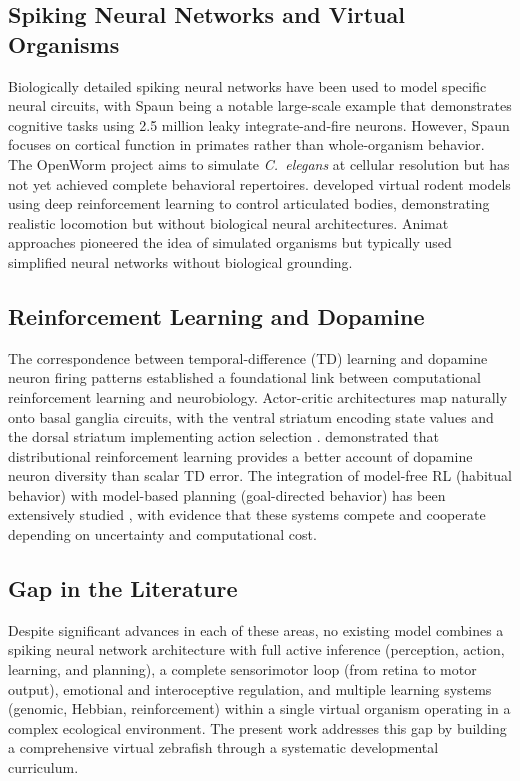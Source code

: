 \documentclass[12pt]{article}
\begin{document}
\subsection{Spiking Neural Networks and Virtual Organisms}

Biologically detailed spiking neural networks have been used to model
specific neural circuits, with Spaun \citep{eliasmith2012} being a
notable large-scale example that demonstrates cognitive tasks using
2.5 million leaky integrate-and-fire neurons.
However, Spaun focuses on cortical function in primates rather than
whole-organism behavior.
The OpenWorm project \citep{openworm2014} aims to simulate
\textit{C.\ elegans} at cellular resolution but has not yet achieved
complete behavioral repertoires.
\citet{merel2019} developed virtual rodent models using deep
reinforcement learning to control articulated bodies, demonstrating
realistic locomotion but without biological neural architectures.
Animat approaches \citep{wilson1991} pioneered the idea of simulated
organisms but typically used simplified neural networks without
biological grounding.

\subsection{Reinforcement Learning and Dopamine}

The correspondence between temporal-difference (TD) learning
\citep{sutton2018} and dopamine neuron firing patterns
\citep{schultz1997} established a foundational link between
computational reinforcement learning and neurobiology.
Actor-critic architectures map naturally onto basal ganglia circuits,
with the ventral striatum encoding state values and the dorsal
striatum implementing action selection \citep{oquist2004}.
\citet{dabney2020} demonstrated that distributional reinforcement
learning provides a better account of dopamine neuron diversity than
scalar TD error.
The integration of model-free RL (habitual behavior) with model-based
planning (goal-directed behavior) has been extensively studied
\citep{daw2011}, with evidence that these systems compete and
cooperate depending on uncertainty and computational cost.

\subsection{Gap in the Literature}

Despite significant advances in each of these areas, no existing model
combines a spiking neural network architecture with full active
inference (perception, action, learning, and planning), a complete
sensorimotor loop (from retina to motor output), emotional and
interoceptive regulation, and multiple learning systems (genomic,
Hebbian, reinforcement) within a single virtual organism operating
in a complex ecological environment.
The present work addresses this gap by building a comprehensive virtual
zebrafish through a systematic developmental curriculum.
\end{document}
